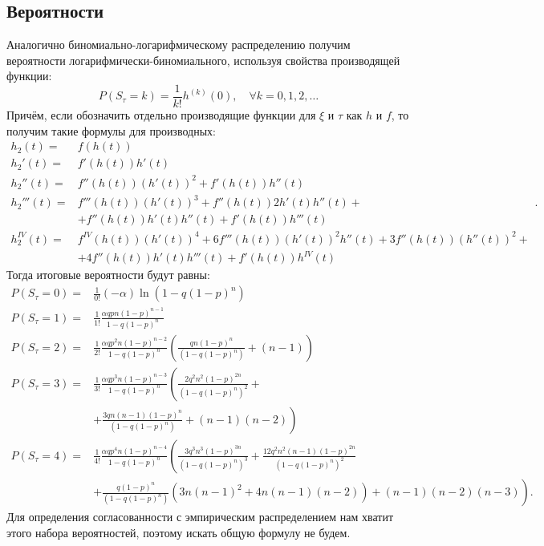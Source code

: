 \documentclass[12pt, specialist, subf, substylefile = spbu_report.rtx]{disser}
\begin{document}
	\subsection{Вероятности}
	
	Аналогично биномиально-логарифмическому распределению получим вероятности логарифмически-биномиального, используя свойства производящей функции: 
	\[
		P(S _\tau = k) = \frac {1} {k!} h ^{(k)} (0), \quad \forall k = 0, 1, 2, \dots
	\]
	Причём, если обозначить отдельно производящие функции для $ \xi $ и $ \tau $ как $ h $ и $ f $, то получим такие формулы для производных:
	\[
		\begin{aligned}
		 	h _2(t)=& f(h(t))\\
		 	h _2'(t)=& f'(h(t))h'(t)\\
		 	h _2''(t)=& f''(h(t))(h'(t))^2+f'(h(t))h''(t)\\
		 	h _2'''(t)=& f'''(h(t))(h'(t))^3+f''(h(t))2h'(t)h''(t)+\\
		 	& +f''(h(t))h'(t)h''(t)+f'(h(t))h'''(t)\\
		 	h _2^{IV}(t)=& f^{IV}(h(t))(h'(t))^4+6f'''(h(t))(h'(t))^2h''(t)+3f''(h(t))(h''(t))^2+\\
		 	& +4f''(h(t))h'(t)h'''(t)+f'(h(t))h^{IV}(t)
		\end{aligned}.
	\]
	Тогда итоговые вероятности будут равны:
	\[
		\begin{aligned}
		 	P(S _\tau = 0)=& \frac 1 {0!} (-\alpha) \ln (1 - q (1 - p) ^n)\\
		 	P(S _\tau = 1)=& \frac 1 {1!} \frac {\alpha q p n (1 - p) ^{n - 1}} {1 - q (1 - p) ^n}\\
		 	P(S _\tau = 2)=& \frac 1 {2!} \frac {\alpha q p ^2 n (1 - p) ^{n - 2}} {1 - q (1 - p) ^n} \left( \frac {qn (1 - p) ^n} {(1 - q (1 - p) ^n)} + (n - 1) \right)\\
		 	P(S _\tau = 3)=& \frac 1 {3!} \frac {\alpha q p ^3 n (1 - p) ^{n - 3}} {1 - q (1 - p) ^n} \left( \frac {2q^2n^2 (1 - p) ^{2n}} {(1 - q (1 - p) ^n)^2} +\right.\\
		 	&\left.+ \frac {3qn (n - 1) (1 - p) ^n} {(1 - q (1 - p) ^n)} + (n - 1)(n - 2) \right)\\
		 	P(S _\tau = 4)=& \frac 1 {4!} \frac {\alpha q p ^4 n (1 - p) ^{n - 4}} {1 - q (1 - p) ^n} \left( \frac {3q^3n^3 (1 - p) ^{3n}} {(1 - q (1 - p) ^n)^3} + \frac {12q^2n^2 (n - 1) (1 - p) ^{2n}} {(1 - q (1 - p) ^n)^2}\right.\\
		 	&\left.+ \frac {q(1 - p) ^{n}} {(1 - q (1 - p) ^n)}\left(3n(n - 1) ^2 + 4n(n - 1)(n - 2)\right) + (n - 1)(n - 2)(n - 3) \right).
		\end{aligned}
	\]
	Для определения согласованности с эмпирическим распределением нам хватит этого набора вероятностей, поэтому искать общую формулу не будем.
	
\end{document}
